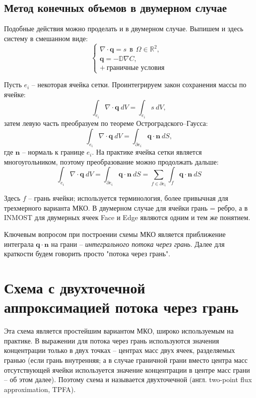 \documentclass[a4paper, 11pt]{article}
\begin{document}
\subsection{Метод конечных объемов в двумерном случае}

Подобные действия можно проделать и в двумерном случае. Выпишем и здесь систему в смешанном виде:
\begin{equation}
\begin{cases}
\nabla\cdot\mathbf{q} = s~~\text{в}~~\Omega\in\mathbb{R}^2,\\
\mathbf{q} = - \mathbb{D}\nabla C,\\
+~\text{граничные условия}
\end{cases}
\end{equation}

Пусть $e_i$ -- некоторая ячейка сетки. Проинтегрируем закон сохранения массы по ячейке:
\begin{equation}
\int_{e_i}\nabla\cdot\mathbf{q}~dV = \int_{e_i}s~dV,
\end{equation}
затем левую часть преобразуем по теореме Остроградского--Гаусса:
\begin{equation}
\int_{e_i}\nabla\cdot\mathbf{q}~dV = \int_{\partial e_i}\mathbf{q}\cdot\mathbf{n}~dS,
\end{equation}
где $\mathbf{n}$ -- нормаль к границе $e_i$. На практике ячейка сетки является многоугольником, поэтому преобразование можно продолжать дальше:
\begin{equation}
\int_{e_i}\nabla\cdot\mathbf{q}~dV = \int_{\partial e_i}\mathbf{q}\cdot\mathbf{n}~dS 
= 
\sum_{f \in \partial e_i} \int_{f}\mathbf{q}\cdot\mathbf{n} ~dS
\end{equation}

Здесь $f$ -- грань ячейки; используется терминология, более привычная для трехмерного варианта МКО. В двумерном случае для ячейки грань = ребро, а в INMOST для двумерных ячеек Face и Edge являются одним и тем же понятием.

Ключевым вопросом при построении схемы МКО является приближение интеграла $\mathbf{q}\cdot\mathbf{n}$ на грани -- \textit{интегрального потока через грань}. Далее для краткости будем говорить просто "потока через грань".

\section{Схема с двухточечной аппроксимацией потока через грань}

Эта схема является простейшим вариантом МКО, широко используемым на практике. В выражении для потока через грань используются значения концентрации только в двух точках -- центрах масс двух ячеек, разделяемых гранью (если грань внутренняя; а в случае граничной грани вместо центра масс отсутствующей ячейки используется значение концентрации в центре масс грани -- об этом далее). Поэтому схема и называется двухточечной (англ. two-point flux approximation, TPFA).
\end{document}
